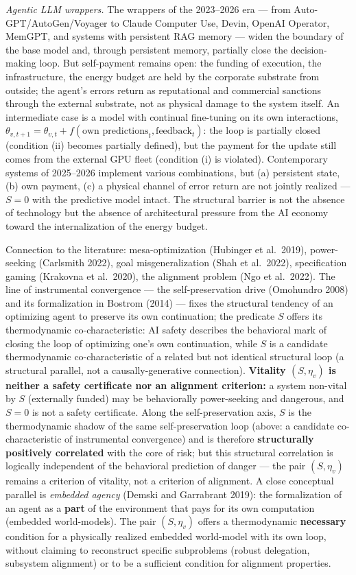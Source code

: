 \documentclass[pdflatex,sn-mathphys-ay]{sn-jnl}
\begin{document}
\emph{Agentic LLM wrappers.} The wrappers of the 2023--2026 era --- from Auto-GPT/AutoGen/Voyager to Claude Computer Use, Devin, OpenAI Operator, MemGPT, and systems with persistent RAG memory --- widen the boundary of the base model and, through persistent memory, partially close the decision-making loop. But self-payment remains open: the funding of execution, the infrastructure, the energy budget are held by the corporate substrate from outside; the agent's errors return as reputational and commercial sanctions through the external substrate, not as physical damage to the system itself. An intermediate case is a model with continual fine-tuning on its own interactions, \(\theta_{v,t+1} = \theta_{v,t} + f(\text{own predictions}_t, \text{feedback}_t)\): the loop is partially closed (condition (ii) becomes partially defined), but the payment for the update still comes from the external GPU fleet (condition (i) is violated). Contemporary systems of 2025--2026 implement various combinations, but (a) persistent state, (b) own payment, (c) a physical channel of error return are not jointly realized --- \(S = 0\) with the predictive model intact. The structural barrier is not the absence of technology but the absence of architectural pressure from the AI economy toward the internalization of the energy budget.

Connection to the literature: mesa-optimization (Hubinger et al.~2019), power-seeking (Carlsmith 2022), goal misgeneralization (Shah et al.~2022), specification gaming (Krakovna et al.~2020), the alignment problem (Ngo et al.~2022). The line of instrumental convergence --- the self-preservation drive (Omohundro 2008) and its formalization in Bostrom (2014) --- fixes the structural tendency of an optimizing agent to preserve its own continuation; the predicate \(S\) offers its thermodynamic co-characteristic: AI safety describes the behavioral mark of closing the loop of optimizing one's own continuation, while \(S\) is a candidate thermodynamic co-characteristic of a related but not identical structural loop (a structural parallel, not a causally-generative connection). \textbf{Vitality \((S, \eta_v)\) is neither a safety certificate nor an alignment criterion:} a system non-vital by \(S\) (externally funded) may be behaviorally power-seeking and dangerous, and \(S = 0\) is not a safety certificate. Along the self-preservation axis, \(S\) is the thermodynamic shadow of the same self-preservation loop (above: a candidate co-characteristic of instrumental convergence) and is therefore \textbf{structurally positively correlated} with the core of risk; but this structural correlation is logically independent of the behavioral prediction of danger --- the pair \((S, \eta_v)\) remains a criterion of vitality, not a criterion of alignment. A close conceptual parallel is \emph{embedded agency} (Demski and Garrabrant 2019): the formalization of an agent as a \textbf{part} of the environment that pays for its own computation (embedded world-models). The pair \((S, \eta_v)\) offers a thermodynamic \textbf{necessary} condition for a physically realized embedded world-model with its own loop, without claiming to reconstruct specific subproblems (robust delegation, subsystem alignment) or to be a sufficient condition for alignment properties.
\end{document}
